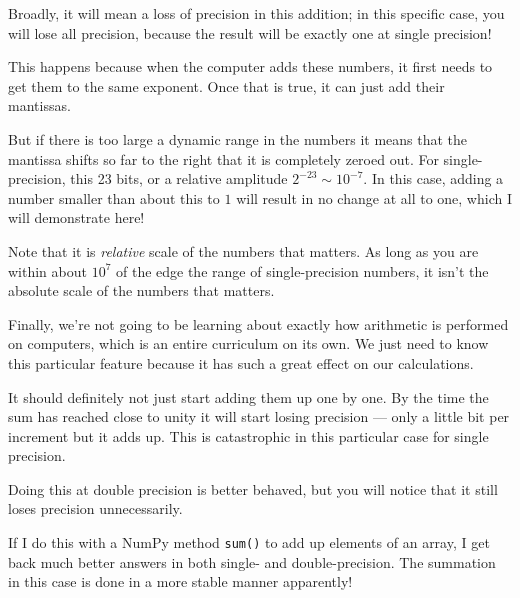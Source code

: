 \begin{answer}
Broadly, it will mean a loss of precision in this addition; in this
specific case, you will lose all precision, because the result will be
exactly one at single precision!

This happens because when the computer adds these numbers, it first
needs to get them to the same exponent. Once that is true, it can just
add their mantissas. 

But if there is too large a dynamic range in the numbers it means that
the mantissa shifts so far to the right that it is completely zeroed
out. For single-precision, this 23 bits, or a relative amplitude
$2^{-23} \sim 10^{-7}$. In this case, adding a number smaller than
about this to $1$ will result in no change at all to one, which I will
demonstrate here!

Note that it is {\it relative} scale of the numbers that matters. As
long as you are within about $10^7$ of the edge the range of
single-precision numbers, it isn't the absolute scale of the numbers
that matters.

Finally, we're not going to be learning about exactly how arithmetic
is performed on computers, which is an entire curriculum on its own.
We just need to know this particular feature because it has such a
great effect on our calculations.
\end{answer}

  
\begin{answer}
It should definitely not just start adding them up one by one. By the
time the sum has reached close to unity it will start losing precision
--- only a little bit per increment but it adds up. This is
catastrophic in this particular case for single precision.

Doing this at double precision is better behaved, but you will notice
that it still loses precision unnecessarily.

If I do this with a NumPy method {\tt sum()} to add up elements of an
array, I get back much better answers in both single- and
double-precision. The summation in this case is done in a more stable
manner apparently!
\end{answer}
